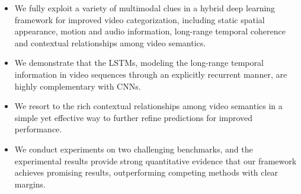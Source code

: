 \documentclass[journal]{IEEEtran}
\begin{document}
\begin{itemize}
\item We fully exploit a variety of multimodal clues in a hybrid deep learning framework for improved video categorization, including static spatial appearance, motion and audio information, long-range temporal coherence and contextual relationships among video semantics.
\item We demonstrate that the LSTMs, modeling the long-range temporal information in video sequences through an explicitly recurrent manner, are highly complementary with CNNs.

\item We resort to the rich contextual relationships among video semantics in a simple yet effective way to further refine predictions for improved performance.

\item We conduct experiments on two challenging benchmarks, and the experimental results provide strong quantitative evidence that our framework achieves promising results, outperforming competing methods with clear margins.
\end{itemize}
\end{document}
